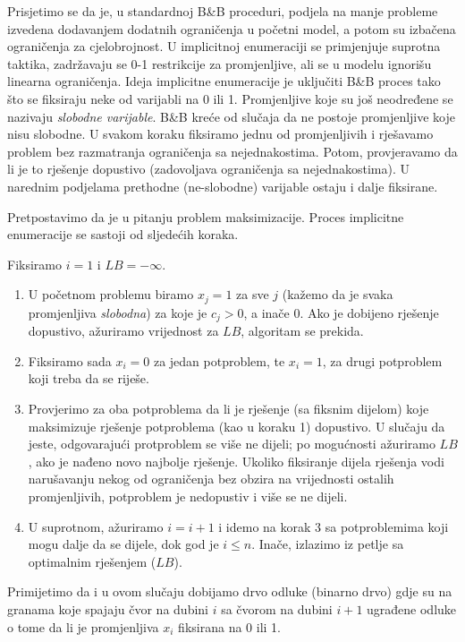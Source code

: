 \documentclass[a4paper, utf8, 11pt, colorlinks]{book}
\theoremstyle{definition}
\begin{document}
Prisjetimo se da je, u standardnoj B\&B proceduri, podjela na manje probleme izvedena dodavanjem dodatnih ograničenja u početni model, a potom su izbačena ograničenja za cjelobrojnost. 
U implicitnoj enumeraciji se primjenjuje suprotna taktika, zadržavaju se 0-1 restrikcije za promjenljive, ali se  u modelu ignorišu linearna ograničenja. 
Ideja implicitne enumeracije je uključiti B\&B proces tako što se fiksiraju neke od varijabli na 0 ili 1. Promjenljive koje su još neodređene se nazivaju \emph{slobodne varijable}.  B\&B kreće od slučaja da ne postoje promjenljive koje nisu slobodne. U svakom koraku fiksiramo jednu od promjenljivih i rješavamo problem bez razmatranja ograničenja sa nejednakostima. Potom, provjeravamo da li je to rješenje dopustivo (zadovoljava ograničenja sa nejednakostima). U narednim podjelama  prethodne (ne-slobodne) varijable ostaju i dalje fiksirane. 


Pretpostavimo da je u pitanju problem maksimizacije. Proces implicitne enumeracije se sastoji od sljedećih koraka. 

Fiksiramo $i=1$ i $LB=-\infty$. 

\begin{enumerate}
    \item U početnom problemu  biramo $x_j=1$ za sve $j$ (kažemo da je svaka promjenljiva \emph{slobodna}) za koje je $c_j > 0$, a inače 0. Ako je dobijeno rješenje dopustivo, ažuriramo vrijednost za $LB$, algoritam se prekida.
    \item Fiksiramo sada $x_i=0$ za jedan potproblem, te $x_i=1$, za drugi potproblem koji treba da se riješe.
    
    \item  Provjerimo za oba potproblema da li je rješenje (sa fiksnim dijelom) koje maksimizuje rješenje potproblema (kao u koraku 1) dopustivo. U slučaju da jeste,   odgovarajući protproblem se više ne dijeli; po mogućnosti ažuriramo $LB$, ako je nađeno novo najbolje rješenje.  Ukoliko fiksiranje dijela rješenja vodi narušavanju nekog od ograničenja bez obzira na vrijednosti ostalih promjenljivih, potproblem je nedopustiv i više se ne dijeli. 
    
    
    \item U suprotnom, ažuriramo $i = i+1$ i idemo na korak 3 sa potproblemima koji mogu dalje da se dijele, dok god je $i \leq n$. Inače, izlazimo iz petlje sa optimalnim rješenjem ($LB$). 
\end{enumerate}
 Primijetimo da i u ovom slučaju dobijamo drvo odluke (binarno drvo) gdje su na granama koje spajaju čvor na dubini $i$ sa čvorom na dubini $i+1$  ugrađene odluke o tome da li je promjenljiva $x_i$ fiksirana na 0 ili 1.
\end{document}
